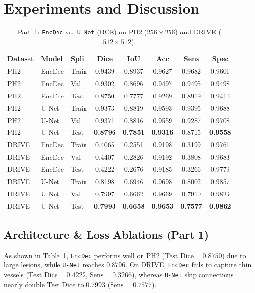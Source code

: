 \section{Experiments and Discussion}
\label{sec:results}

\begin{table}[t]
\centering
\caption{Part~1: \texttt{EncDec} vs.\ \texttt{U-Net} (BCE) on PH2 ($256\times256$) and DRIVE ($512\times512$).}
\label{tab:main_results}
\scriptsize
\begin{tabular}{@{}lllccccc@{}}
\toprule
Dataset & Model & Split & Dice & IoU & Acc & Sens & Spec \\
\midrule
PH2 & EncDec & Train & 0.9439 & 0.8937 & 0.9627 & 0.9682 & 0.9601 \\
PH2 & EncDec & Val   & 0.9302 & 0.8696 & 0.9497 & 0.9495 & 0.9498 \\
PH2 & EncDec & Test  & 0.8750 & 0.7777 & 0.9269 & 0.8919 & 0.9410 \\
\midrule
PH2 & U-Net  & Train & 0.9373 & 0.8819 & 0.9593 & 0.9395 & 0.9688 \\
PH2 & U-Net  & Val   & 0.9371 & 0.8816 & 0.9559 & 0.9287 & 0.9708 \\
PH2 & U-Net  & Test  & \textbf{0.8796} & \textbf{0.7851} & \textbf{0.9316} & 0.8715 & \textbf{0.9558} \\
\midrule
DRIVE & EncDec & Train & 0.4065 & 0.2551 & 0.9198 & 0.3199 & 0.9761 \\
DRIVE & EncDec & Val   & 0.4407 & 0.2826 & 0.9192 & 0.3808 & 0.9683 \\
DRIVE & EncDec & Test  & 0.4222 & 0.2676 & 0.9185 & 0.3266 & 0.9779 \\
\midrule
DRIVE & U-Net  & Train & 0.8198 & 0.6946 & 0.9698 & 0.8002 & 0.9857 \\
DRIVE & U-Net  & Val   & 0.7997 & 0.6662 & 0.9669 & 0.7910 & 0.9829 \\
DRIVE & U-Net  & Test  & \textbf{0.7993} & \textbf{0.6658} & \textbf{0.9653} & \textbf{0.7577} & \textbf{0.9862} \\
\bottomrule
\end{tabular}
\end{table}

\subsection{Architecture & Loss Ablations (Part 1)}
As shown in Table~\ref{tab:main_results}, \texttt{EncDec} performs well on PH2 ($\text{Test Dice}=0.8750$) due to large lesions, while \texttt{U-Net} reaches $0.8796$. On DRIVE, \texttt{EncDec} fails to capture thin vessels ($\text{Test Dice}=0.4222$, $\text{Sens}=0.3266$), whereas \texttt{U-Net} skip connections nearly double Test Dice to $0.7993$ ($\text{Sens}=0.7577$).

